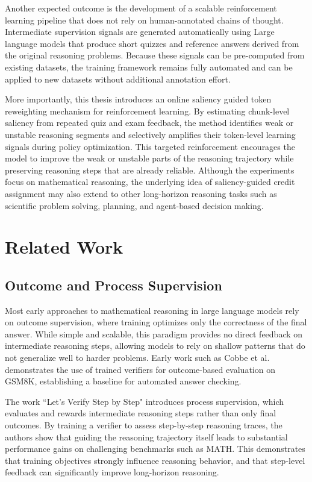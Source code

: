 \documentclass[12pt]{report}
\begin{document}
Another expected outcome is the development of a scalable reinforcement learning pipeline that does not rely on human-annotated chains of thought. 
Intermediate supervision signals are generated automatically using Large language models that produce short quizzes and reference answers derived from the original reasoning problems. 
Because these signals can be pre-computed from existing datasets, the training framework remains fully automated and can be applied to new datasets without additional annotation effort.

More importantly, this thesis introduces an online saliency guided token reweighting mechanism for reinforcement learning. 
By estimating chunk-level saliency from repeated quiz and exam
feedback, the method identifies weak or unstable reasoning segments and selectively amplifies their token-level learning signals during policy optimization. 
This targeted reinforcement encourages the model to improve the weak or unstable parts of the reasoning trajectory while preserving reasoning steps that are already reliable.
Although the experiments focus on mathematical reasoning, the underlying idea of saliency-guided credit assignment may also extend
to other long-horizon reasoning tasks such as scientific problem solving, planning, and agent-based decision making.



\chapter{Related Work}
\section{Outcome and Process Supervision}
Most early approaches to mathematical reasoning in large language models rely on outcome supervision, where training optimizes only the correctness of the final answer. While simple and scalable, this paradigm provides no direct feedback on intermediate reasoning steps, allowing models to rely on shallow patterns that do not generalize well to harder problems. Early work such as Cobbe et al.~\cite{cobbe2021trainingverifierssolvemath} demonstrates the use of trained verifiers for outcome-based evaluation on GSM8K, establishing a baseline for automated answer checking.

The work “Let’s Verify Step by Step"\cite{lightman2023letsverifystepstep} introduces process supervision, which evaluates and rewards intermediate reasoning steps rather than only final outcomes. By training a verifier to assess step-by-step reasoning traces, the authors show that guiding the reasoning trajectory itself leads to substantial performance gains on challenging benchmarks such as MATH. This demonstrates that training objectives strongly influence reasoning behavior, and that step-level feedback can significantly improve long-horizon reasoning.
\end{document}
